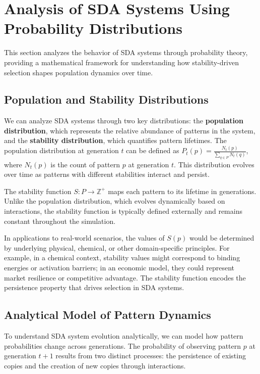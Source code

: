 \documentclass[preprint,12pt]{elsarticle}
\begin{document}
\section{Analysis of SDA Systems Using Probability Distributions}

This section analyzes the behavior of SDA systems through probability theory, providing a mathematical framework for understanding how stability-driven selection shapes population dynamics over time.

\subsection{Population and Stability Distributions}

We can analyze SDA systems through two key distributions: the \textbf{population distribution}, which represents the relative abundance of patterns in the system, and the \textbf{stability distribution}, which quantifies pattern lifetimes. The population distribution at generation \( t \) can be defined as \( P_t(p) = \frac{N_t(p)}{\sum_{q \in P} N_t(q)} \), where \( N_t(p) \) is the count of pattern \( p \) at generation \( t \). This distribution evolves over time as patterns with different stabilities interact and persist.

The stability function \( S: P \rightarrow \mathbb{Z}^{+} \) maps each pattern to its lifetime in generations. Unlike the population distribution, which evolves dynamically based on interactions, the stability function is typically defined externally and remains constant throughout the simulation.

In applications to real-world scenarios, the values of \(S(p)\) would be determined by underlying physical, chemical, or other domain-specific principles. For example, in a chemical context, stability values might correspond to binding energies or activation barriers; in an economic model, they could represent market resilience or competitive advantage. The stability function encodes the persistence property that drives selection in SDA systems.

\subsection{Analytical Model of Pattern Dynamics}

To understand SDA system evolution analytically, we can model how pattern probabilities change across generations. The probability of observing pattern \(p\) at generation \(t+1\) results from two distinct processes: the persistence of existing copies and the creation of new copies through interactions.
\end{document}
